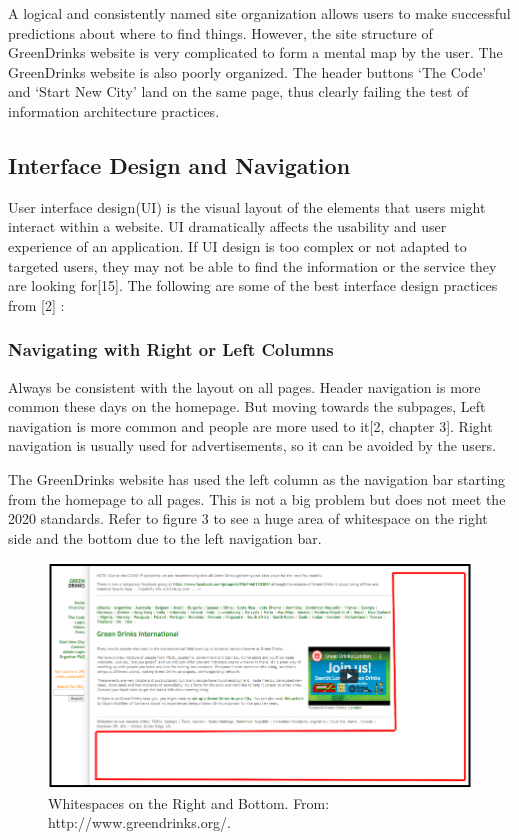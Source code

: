 \documentclass[12pt]{article}
\begin{document}
A logical and consistently named site organization allows users to make successful predictions about where to find things. However, the site structure of  GreenDrinks website is very complicated to form a mental map by the user. The GreenDrinks website is also poorly organized. The header buttons ‘The Code’ and ‘Start New City’ land on the same page, thus clearly failing the test of information architecture practices.

\subsection*{Interface Design and Navigation}
User interface design(UI) is the visual layout of the elements that users might interact within a website.  UI dramatically affects the usability and user experience of an application.  If UI design is too complex or not adapted to targeted users, they may not be able to find the information or the service they are looking for[15]. The following are some of the best  interface design practices from [2] : 

\subsubsection*{Navigating with Right or Left Columns}	
Always be consistent with the layout on all pages. Header navigation is more common these days on the homepage. But moving towards the subpages, Left navigation is more common and people are more used to it[2, chapter 3]. Right navigation is usually used for advertisements, so it can be avoided by the users. 

The GreenDrinks website has used the left column as the navigation bar starting from the homepage to all pages. This is not a big problem but does not meet the 2020 standards. Refer to figure 3 to see a huge area of whitespace on the right side and the bottom due to the left navigation bar.

\begin{figure}[ht]
\centering
\includegraphics[width=1.0\textwidth]{f3}
\caption[Whitespaces on the Right and Bottom.]{Whitespaces on the Right and Bottom. From: http://www.greendrinks.org/\footnotemark.}
\end{figure}
 
\end{document}
